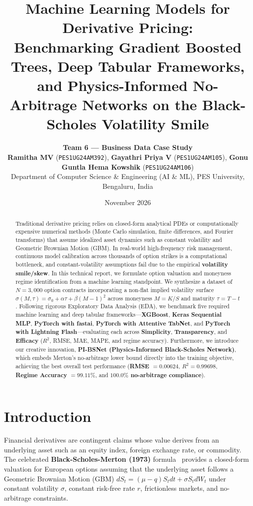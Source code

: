 \documentclass[10pt,twocolumn]{article}
\title{\vspace{-1.4em}\textbf{\Large Machine Learning Models for Derivative Pricing:\\Benchmarking Gradient Boosted Trees, Deep Tabular Frameworks, and Physics-Informed No-Arbitrage Networks on the Black-Scholes Volatility Smile}\vspace{-0.4em}}
\author{
    \textbf{Team 6 --- Business Data Case Study}\\
    \textbf{Ramitha MV} (\texttt{PES1UG24AM392}), \quad \textbf{Gayathri Priya V} (\texttt{PES1UG24AM105}), \quad \textbf{Gonu Guntla Hema Kowshik} (\texttt{PES1UG24AM106})\\[0.25em]
    \small Department of Computer Science \& Engineering (AI \& ML), PES University, Bengaluru, India
}
\date{\vspace{-1.1em}\small November 2026\vspace{-0.9em}}
\begin{document}
\maketitle

\begin{abstract}
\noindent Traditional derivative pricing relies on closed-form analytical PDEs or computationally expensive numerical methods (Monte Carlo simulation, finite differences, and Fourier transforms) that assume idealized asset dynamics such as constant volatility and Geometric Brownian Motion (GBM). In real-world high-frequency risk management, continuous model calibration across thousands of option strikes is a computational bottleneck, and constant-volatility assumptions fail due to the empirical \textbf{volatility smile/skew}. In this technical report, we formulate option valuation and moneyness regime identification from a machine learning standpoint. We synthesize a dataset of $N=3,000$ option contracts incorporating a non-flat implied volatility surface $\sigma(M,\tau) = \sigma_0 + \alpha\tau + \beta(M-1)^2$ across moneyness $M=K/S$ and maturity $\tau=T-t$. Following rigorous Exploratory Data Analysis (EDA), we benchmark five required machine learning and deep tabular frameworks---\textbf{XGBoost}, \textbf{Keras Sequential MLP}, \textbf{PyTorch with fastai}, \textbf{PyTorch with Attentive TabNet}, and \textbf{PyTorch with Lightning Flash}---evaluating each across \textbf{Simplicity}, \textbf{Transparency}, and \textbf{Efficacy} ($R^2$, RMSE, MAE, MAPE, and regime accuracy). Furthermore, we introduce our creative innovation, \textbf{PI-BSNet (Physics-Informed Black-Scholes Network)}, which embeds Merton's no-arbitrage lower bound directly into the training objective, achieving the best overall test performance (\textbf{RMSE $= 0.00624$}, \textbf{$R^2 = 0.99698$}, \textbf{Regime Accuracy $= 99.11\%$}, and \textbf{$100.0\%$ no-arbitrage compliance}).
\end{abstract}

\section{Introduction}
Financial derivatives are contingent claims whose value derives from an underlying asset such as an equity index, foreign exchange rate, or commodity. The celebrated \textbf{Black-Scholes-Merton (1973)} formula~\cite{blackscholes1973} provides a closed-form valuation for European options assuming that the underlying asset follows a Geometric Brownian Motion (GBM) $dS_t = (\mu - q)S_t dt + \sigma S_t dW_t$ under constant volatility $\sigma$, constant risk-free rate $r$, frictionless markets, and no-arbitrage constraints.
\end{document}
